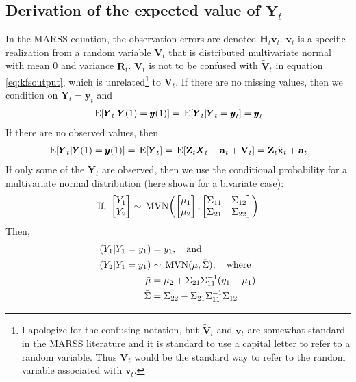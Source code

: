 \documentclass[]{article}
\def\XI{\mbox{\boldmath $\Xi$}}
\def\E{\,\textup{\textrm{E}}}
\def\HH{\mbox{$\mathbf H$}}	\def\hh{\mbox{$\mathbf h$}}
\def\MVN{\,\textup{\textrm{MVN}}}
\def\RR{\mbox{$\mathbf R$}}	 \def\rr{\mbox{$\mathbf r$}} \def\Rb{\mbox{$\mathbf H$}}	\def\Rm{\mathbb{R}}
\def\VV{\mbox{$\mathbf V$}}	\def\vv{\mbox{$\mathbf v$}}
\def\XX{\mbox{$\pmb{X}$}}	\def\xx{\mbox{$\pmb{x}$}}
\def\YY{\mbox{$\pmb{Y}$}}	\def\yy{\mbox{$\pmb{y}$}}
\def\ZZ{\mbox{$\mathbf Z$}}	\def\zz{\mbox{$\mathbf z$}}	\def\Zb{\mbox{$\mathbf M$}} \def\Za{\mbox{$\mathbf N$}} \def\Zm{\XI}
\def\hatxt{\widetilde{\mbox{$\mathbf x$}}_t}
\begin{document}
\subsection{Derivation of the expected value of $\YY_t$}
In the MARSS equation, the observation errors are denoted $\HH_t\vv_t$.  $\vv_t$ is a specific realization from a random variable $\VV_t$ that is distributed multivariate normal with mean 0 and variance $\RR_t$.  $\VV_t$ is not to be confused with $\widetilde{\VV}_t$ in equation \ref{eq:kfsoutput}, which is unrelated\footnote{I apologize for the confusing notation, but $\widetilde{\VV}_t$ and $\vv_t$ are somewhat standard in the MARSS literature and it is standard to use a capital letter to refer to a random variable.  Thus $\VV_t$ would be the standard way to refer to the random variable associated with $\vv_t$.} to $\VV_t$. If there are no missing values, then we condition on $\YY_t=\yy_t$ and
\begin{equation}
\begin{split}
\E[\YY_t|\YY(1)=\yy(1)] = \E[\YY_t|\YY_t=\yy_t] = \yy_t\\
\end{split}
\end{equation}
If there are no observed values, then 
\begin{equation}
\begin{split}
\E[\YY_t|\YY(1)=\yy(1)]=\E[\YY_t] = \E[\ZZ_t\XX_t+\aa_t+\VV_t] = \ZZ_t\hatxt+\aa_t
\end{split}
\end{equation}
If only some of the $\YY_t$ are observed, then we use the conditional probability for a multivariate normal distribution (here shown for a bivariate case):
\begin{equation}\label{eq:cond.multi.normal}
\text{If, }\begin{bmatrix}
Y_1\\
Y_2\end{bmatrix}
\sim 
\MVN\biggl( \begin{bmatrix}
\mu_1\\
\mu_2
\end{bmatrix}, \begin{bmatrix}
\Sigma_{11}&\Sigma_{12}\\
\Sigma_{21}&\Sigma_{22}\end{bmatrix}\biggr)
\end{equation}
Then, 
\begin{equation}
\begin{split}
(Y_1|Y_1=y_1) &=y_1,\quad\text{and}\\
(Y_2|Y_1=y_1) &\sim \MVN(\bar{\mu},\bar{\Sigma}),\quad\text{where}\\
\bar{\mu}&= \mu_2+\Sigma_{21}\Sigma_{11}^{-1}(y_1-\mu_1)\\
\bar{\Sigma} &= \Sigma_{22}-\Sigma_{21}\Sigma_{11}^{-1}\Sigma_{12} 
\end{split}
\end{equation}
\end{document}
